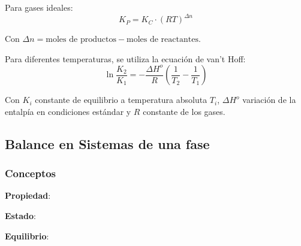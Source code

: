         Para gases ideales:
        \begin{equation}
        \label{eq:k_c_gases_id}
            K_{P} = K_{C} \cdot \left ( RT\right )^{\Delta n}
        \end{equation}
        
        Con \(\Delta n = \text{moles de productos} - \text{moles de reactantes}\).
        
        Para diferentes temperaturas, se utiliza la ecuación de van't Hoff:
        \begin{equation}
        \label{eq:vant_hoff}
            \ln{\frac{K_{2}}{K_{1}}} = - \frac{\Delta H^{o}}{R} \left ( \frac{1}{T_{2}} - \frac{1}{T_{1}} \right )
        \end{equation}
        
        Con \(K_{i}\) constante de equilibrio a temperatura absoluta \(T_{i}\), \(\Delta H^{o}\) variación de la entalpía en condiciones estándar y \(R\) constante de los gases.
    
    \subsection{Balance en Sistemas de una fase}
    
        \subsubsection{Conceptos}
        
        \textbf{Propiedad}:
        
        \begin{quote}
            \textit{}
        \end{quote}
        
        \textbf{Estado}:
        
        \begin{quote}
            \textit{}
        \end{quote}
        
        \textbf{Equilibrio}:
        
        \begin{quote}
            \textit{}
        \end{quote}
        
